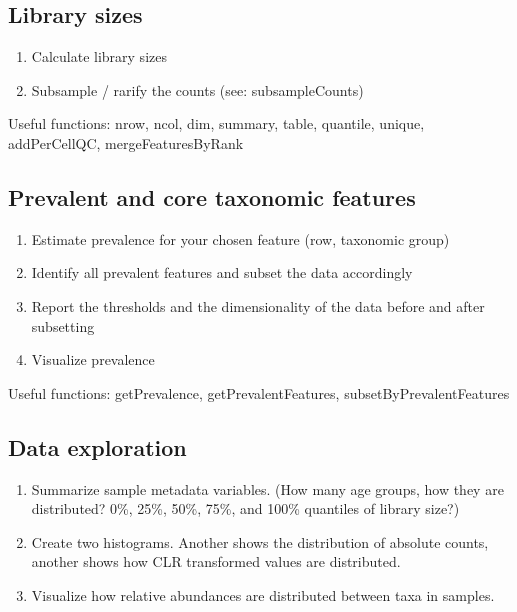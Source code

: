 \documentclass[
]{book}
\providecommand{\tightlist}{%
  \setlength{\itemsep}{0pt}\setlength{\parskip}{0pt}}
\begin{document}
\hypertarget{library-sizes}{%
\subsection{Library sizes}\label{library-sizes}}

\begin{enumerate}
\def\labelenumi{\arabic{enumi}.}
\tightlist
\item
  Calculate library sizes
\item
  Subsample / rarify the counts (see: subsampleCounts)
\end{enumerate}

Useful functions: nrow, ncol, dim, summary, table, quantile, unique, addPerCellQC, mergeFeaturesByRank

\hypertarget{prevalent-and-core-taxonomic-features}{%
\subsection{Prevalent and core taxonomic features}\label{prevalent-and-core-taxonomic-features}}

\begin{enumerate}
\def\labelenumi{\arabic{enumi}.}
\tightlist
\item
  Estimate prevalence for your chosen feature (row, taxonomic group)
\item
  Identify all prevalent features and subset the data accordingly
\item
  Report the thresholds and the dimensionality of the data before and after subsetting
\item
  Visualize prevalence
\end{enumerate}

Useful functions: getPrevalence, getPrevalentFeatures, subsetByPrevalentFeatures

\hypertarget{data-exploration}{%
\subsection{Data exploration}\label{data-exploration}}

\begin{enumerate}
\def\labelenumi{\arabic{enumi}.}
\tightlist
\item
  Summarize sample metadata variables. (How many age groups, how they are distributed? 0\%, 25\%, 50\%, 75\%, and 100\% quantiles of library size?)
\item
  Create two histograms. Another shows the distribution of absolute counts, another shows how CLR transformed values are distributed.
\item
  Visualize how relative abundances are distributed between taxa in samples.
\end{enumerate}
\end{document}
